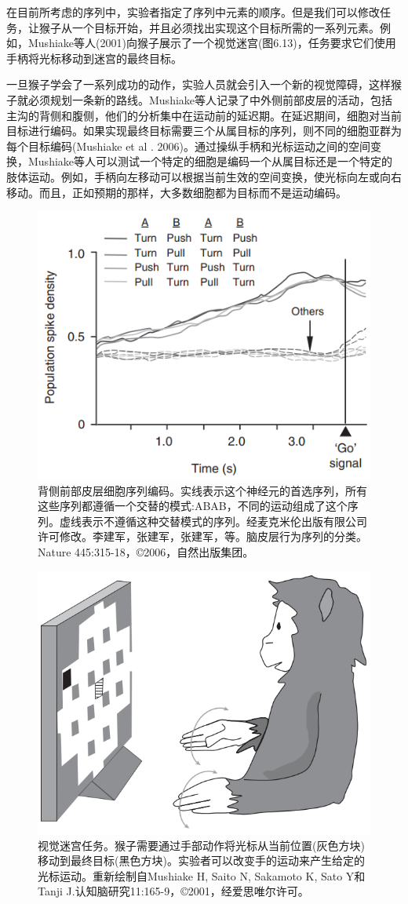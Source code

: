 在目前所考虑的序列中，实验者指定了序列中元素的顺序。但是我们可以修改任务，让猴子从一个目标开始，并且必须找出实现这个目标所需的一系列元素。例如，Mushiake等人(2001)向猴子展示了一个视觉迷宫(图6.13)，任务要求它们使用手柄将光标移动到迷宫的最终目标。

一旦猴子学会了一系列成功的动作，实验人员就会引入一个新的视觉障碍，这样猴子就必须规划一条新的路线。Mushiake等人记录了中外侧前部皮层的活动，包括主沟的背侧和腹侧，他们的分析集中在运动前的延迟期。在延迟期间，细胞对当前目标进行编码。如果实现最终目标需要三个从属目标的序列，则不同的细胞亚群为每个目标编码(Mushiake et al . 2006)。通过操纵手柄和光标运动之间的空间变换，Mushiake等人可以测试一个特定的细胞是编码一个从属目标还是一个特定的肢体运动。例如，手柄向左移动可以根据当前生效的空间变换，使光标向左或向右移动。而且，正如预期的那样，大多数细胞都为目标而不是运动编码。
\begin{figure}
	\centering
	\includegraphics[width=0.4\linewidth]{image_pfc/Fig_6_12}
	\caption{背侧前部皮层细胞序列编码。实线表示这个神经元的首选序列，所有这些序列都遵循一个交替的模式:ABAB，不同的运动组成了这个序列。虚线表示不遵循这种交替模式的序列。经麦克米伦出版有限公司许可修改。李建军，张建军，张建军，等。脑皮层行为序列的分类。Nature 445:315-18，©2006，自然出版集团。}
	\label{fig:fig}
\end{figure}
\begin{figure}
	\centering
	\includegraphics[width=0.4\linewidth]{image_pfc/Fig_6_13}
	\caption{视觉迷宫任务。猴子需要通过手部动作将光标从当前位置(灰色方块)移动到最终目标(黑色方块)。实验者可以改变手的运动来产生给定的光标运动。重新绘制自Mushiake H, Saito N, Sakamoto K, Sato Y和Tanji J.认知脑研究11:165-9，©2001，经爱思唯尔许可。}
	\label{fig:fig}
\end{figure}

